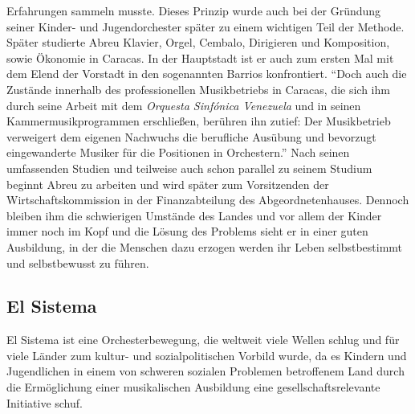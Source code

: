 Erfahrungen sammeln musste. Dieses Prinzip wurde auch bei der Gründung seiner
Kinder- und Jugendorchester später zu einem wichtigen Teil der Methode. Später
studierte Abreu Klavier, Orgel, Cembalo, Dirigieren und Komposition, sowie
Ökonomie in Caracas. In der Hauptstadt ist er auch zum ersten Mal mit dem Elend
der Vorstadt in den sogenannten Barrios konfrontiert. \enquote{Doch auch die
Zustände innerhalb des professionellen Musikbetriebs in Caracas, die sich ihm
durch seine Arbeit mit dem \emph{Orquesta Sinfónica Venezuela} und in seinen
Kammermusikprogrammen erschließen, berühren ihn zutief: Der Musikbetrieb
verweigert dem eigenen Nachwuchs die berufliche Ausübung und bevorzugt
eingewanderte Musiker für die Positionen in
Orchestern.}\autocite[28]{kaufmann:el_sistema} Nach seinen umfassenden Studien
und teilweise auch schon parallel zu seinem Studium beginnt Abreu zu arbeiten
und wird später zum Vorsitzenden der Wirtschaftskommission in der
Finanzabteilung des Abgeordnetenhauses. Dennoch bleiben ihm die schwierigen
Umstände des Landes und vor allem der Kinder immer noch im Kopf und die Lösung
des Problems sieht er in einer guten Ausbildung, in der die Menschen dazu
erzogen werden ihr Leben selbstbestimmt und selbstbewusst zu
führen.\autocite[31]{kaufmann:el_sistema} 



\subsection{El Sistema}

El Sistema ist eine Orchesterbewegung, die weltweit viele Wellen schlug und für
viele Länder zum kultur- und sozialpolitischen Vorbild wurde, da es Kindern und
Jugendlichen in einem von schweren sozialen Problemen betroffenem Land durch die
Ermöglichung einer musikalischen Ausbildung eine gesellschaftsrelevante
Initiative schuf. 


